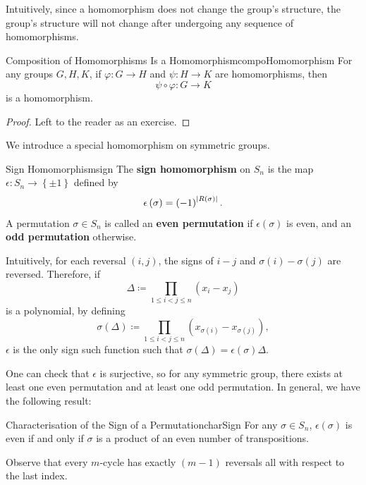 \documentclass[math]{amznotes}
\theoremstyle{remark}
\newcommand{\0}{\mathbf{0}}
\newcommand{\1}{\mathbf{1}}
\begin{document}
Intuitively, since a homomorphism does not change the group's structure, the group's structure will not change after undergoing any sequence of homomorphisms.
\begin{probox}{Composition of Homomorphisms Is a Homomorphism}{compoHomomorphism}
    For any groups $G, H, K$, if $\varphi \colon G \to H$ and $\psi \colon H \to K$ are homomorphisms, then
    \begin{equation*}
        \psi \circ \varphi \colon G \to K
    \end{equation*}
    is a homomorphism.
    \tcblower
    \begin{proof}
        Left to the reader as an exercise.
    \end{proof}
\end{probox}
We introduce a special homomorphism on symmetric groups.
\begin{dfnbox}{Sign Homomorphism}{sign}
    The {\color{red} \textbf{sign homomorphism}} on $S_n$ is the map $\epsilon \colon S_n \to \left\{\pm 1\right\}$ defined by 
    \begin{equation*}
        \epsilon\left(\sigma\right) = \left(-1\right)^{{\left\lvert {R\left(\sigma\right)} \right\rvert}}.
    \end{equation*}
    A permutation $\sigma \in S_n$ is called an {\color{red} \textbf{even permutation}} if $\epsilon\left(\sigma\right)$ is even, and an {\color{red} \textbf{odd permutation}} otherwise.
\end{dfnbox}
Intuitively, for each reversal $\left(i, j\right)$, the signs of $i - j$ and $\sigma\left(i\right) - \sigma\left(j\right)$ are reversed. Therefore, if 
\begin{equation*}
    \Delta \coloneqq \prod_{1 \leq i < j \leq n}\left(x_i - x_j\right)
\end{equation*}
is a polynomial, by defining 
\begin{equation*}
    \sigma\left(\Delta\right) \coloneqq \prod_{1 \leq i < j \leq n}\left(x_{\sigma\left(i\right)} - x_{\sigma\left(j\right)}\right),
\end{equation*}
$\epsilon$ is the only sign such function such that $\sigma\left(\Delta\right) = \epsilon\left(\sigma\right)\Delta$.

One can check that $\epsilon$ is surjective, so for any symmetric group, there exists at least one even permutation and at least one odd permutation. In general, we have the following result:
\begin{corbox}{Characterisation of the Sign of a Permutation}{charSign}
    For any $\sigma\in S_n$, $\epsilon\left(\sigma\right)$ is even if and only if $\sigma$ is a product of an even number of transpositions.
\end{corbox}
Observe that every $m$-cycle has exactly $\left(m - 1\right)$ reversals all with respect to the last index.
\end{document}
